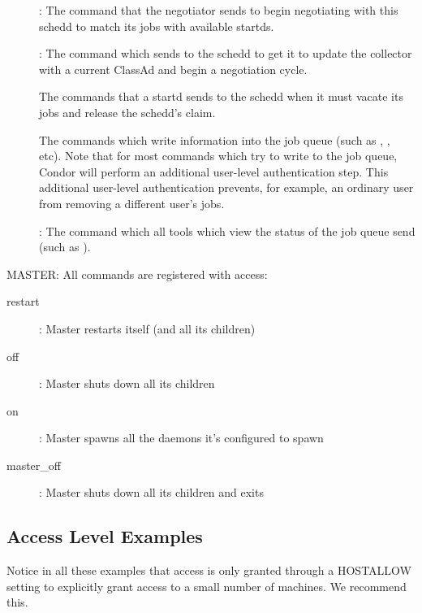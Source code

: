 \begin{description}
\item[] : The command that the negotiator sends to
  begin negotiating with this schedd to match its jobs with available
  startds.

\item[] : The command which  sends to
  the schedd to get it to update the collector with a current ClassAd
  and begin a negotiation cycle.

  The commands that a startd sends to the schedd when it must vacate
  its jobs and release the schedd's claim.

  The commands which write information into the job queue (such as
  , , etc).  
  Note that for most commands which try to write to the job queue, Condor
  will perform an additional user-level authentication step.  
  This additional user-level authentication prevents, for example, an
  ordinary user from removing a different user's jobs.

\item[] : The command which all
  tools which view the status of the job queue send (such as
  ).  
\end{description}

MASTER:  All commands are registered with 
access:

\begin{description}
\item[restart] : Master restarts itself (and all its children)	
\item[off] : Master shuts down all its children
\item[on] : Master spawns all the daemons it's configured to spawn
\item[master\_off] : Master shuts down all its children and exits
\end{description}


\subsection{\label{sec:DCPerm-Examples}Access Level Examples}

Notice in all these examples that  access is
only granted through a HOSTALLOW setting to explicitly grant access to
a small number of machines.  We recommend this.

